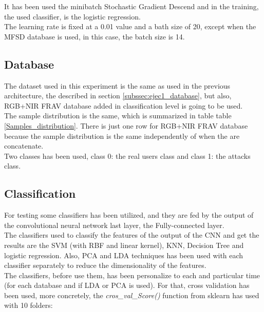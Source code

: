 It has been used the minibatch Stochastic Gradient Descend and in the training, the used classifier, is the logistic regression.\\

The learning rate is fixed at a 0.01 value and a bath size of 20, except when the MFSD database is used, in this case, the batch size is 14.\\

\subsection{Database}
The dataset used in this experiment is the same as used in the previous architecture, the described in section \ref{subssec:ejec1_database}, but also, RGB+NIR FRAV database added in classification level is going to be used.\\

The sample distribution is the same, which is summarized in table table \ref{Samples_distribution}. There is just one row for RGB+NIR FRAV database because the sample distribution is the same independently of when the are concatenate.\\

Two classes has been used, class 0: the real users class and class 1: the attacks class.\\

\subsection{Classification}
For testing some classifiers has been utilized, and they are fed by the output of the convolutional neural network last layer, the Fully-connected layer.\\

The classifiers used to classify the features of the output of the CNN and get the results are the SVM (with RBF and linear kernel), KNN, Decision Tree and logistic regression. Also, PCA and LDA techniques has been used with each classifier separately to reduce the dimensionality of the features.\\

The classifiers, before use them, has been personalize to each and particular time (for each database and if LDA or PCA is used). For that, cross validation has been used, more concretely, the \textit{cros\_val\_Score()} function from sklearn has used with 10 folders:\\

